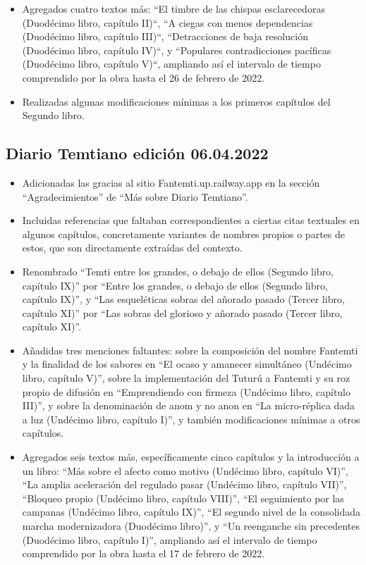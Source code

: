 \documentclass[
]{book}
\begin{document}
\begin{itemize}
\item
  Agregados cuatro textos más: ``El timbre de las chispas esclarecedoras (Duodécimo libro, capítulo II)``, ``A ciegas con menos dependencias (Duodécimo libro, capítulo III)``, ``Detracciones de baja resolución (Duodécimo libro, capítulo IV)``, y ``Populares contradicciones pacíficas (Duodécimo libro, capítulo V)``, ampliando así el intervalo de tiempo comprendido por la obra hasta el 26 de febrero de 2022.
\item
  Realizadas algunas modificaciones mínimas a los primeros capítulos del Segundo libro.
\end{itemize}

\hypertarget{diario-temtiano-ediciuxf3n-06.04.2022}{%
\subsection*{Diario Temtiano edición 06.04.2022}\label{diario-temtiano-ediciuxf3n-06.04.2022}}

\begin{itemize}
\item
  Adicionadas las gracias al sitio Fantemti.up.railway.app en la sección ``Agradecimientos'' de ``Más sobre Diario Temtiano''.
\item
  Incluidas referencias que faltaban correspondientes a ciertas citas textuales en algunos capítulos, concretamente variantes de nombres propios o partes de estos, que son directamente extraídas del contexto.
\item
  Renombrado ``Temti entre los grandes, o debajo de ellos (Segundo libro, capítulo IX)'' por ``Entre los grandes, o debajo de ellos (Segundo libro, capítulo IX)'', y ``Las esqueléticas sobras del añorado pasado (Tercer libro, capítulo XI)'' por ``Las sobras del glorioso y añorado pasado (Tercer libro, capítulo XI)''.
\item
  Añadidas tres menciones faltantes: sobre la composición del nombre Fantemti y la finalidad de los sabores en ``El ocaso y amanecer simultáneo (Undécimo libro, capítulo V)'', sobre la implementación del Tuturú a Fantemti y su roz propio de difusión en ``Emprendiendo con firmeza (Undécimo libro, capítulo III)'', y sobre la denominación de anom y no anon en ``La micro-réplica dada a luz (Undécimo libro, capítulo I)'', y también modificaciones mínimas a otros capítulos.
\item
  Agregados seis textos más, específicamente cinco capítulos y la introducción a un libro: ``Más sobre el afecto como motivo (Undécimo libro, capítulo VI)'', ``La amplia aceleración del regulado pasar (Undécimo libro, capítulo VII)'', ``Bloqueo propio (Undécimo libro, capítulo VIII)'', ``El seguimiento por las campanas (Undécimo libro, capítulo IX)'', ``El segundo nivel de la consolidada marcha modernizadora (Duodécimo libro)'', y ``Un reenganche sin precedentes (Duodécimo libro, capítulo I)'', ampliando así el intervalo de tiempo comprendido por la obra hasta el 17 de febrero de 2022.
\end{itemize}
\end{document}
